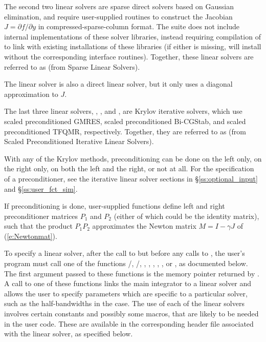 The second two linear solvers are sparse direct solvers based on
Gaussian elimination, and require user-supplied routines to construct
the Jacobian $J = \partial{f}/\partial{y}$ in compressed-sparse-column
format. The {\sundials} suite does not include internal
implementations of these solver libraries, instead requiring
compilation of {\sundials} to link with existing installations of
these libraries (if either is missing, {\sundials} will install
without the corresponding interface routines).  Together, these linear
solvers are referred to as {\cvsls} (from Sparse Linear Solvers). 

The {\cvdiag} linear solver is also a direct linear solver, but it
only uses a diagonal approximation to $J$.

The last three {\cvode} linear solvers, {\cvspgmr}, {\cvspbcg}, and {\cvsptfqmr},
are Krylov iterative solvers, which use scaled preconditioned GMRES, scaled
preconditioned Bi-CGStab, and scaled preconditioned TFQMR, respectively.
Together, they are referred to as {\cvspils} (from Scaled Preconditioned 
Iterative Linear Solvers).

With any of the Krylov methods, preconditioning can be done on the left only, 
on the right only, on both the left and the right, or not at all. 
For the specification of a preconditioner, see the iterative linear solver sections 
in \S\ref{ss:optional_input} and \S\ref{ss:user_fct_sim}.

If preconditioning is done, user-supplied functions define left and right 
preconditioner matrices $P_1$ and $P_2$ (either of which could be the identity
matrix), such that the product $P_1 P_2$ approximates the Newton matrix
$M = I - \gamma J$ of (\ref{e:Newtonmat}).

To specify a {\cvode} linear solver, after the call to 
but before any calls to , the user's program must call one
of the functions /, /, 
, , , , ,
or , as documented below. 
The first argument passed to these functions is the {\cvode}
memory pointer returned by .  A call to one of these
functions links the main {\cvode} integrator to a linear solver and
allows the user to specify parameters which are specific to a
particular solver, such as the half-bandwidths in the {\cvband} case.
The use of each of the linear solvers involves certain constants and possibly 
some macros, that are likely to be needed in the user code.  These are
available in the corresponding header file associated with the linear
solver, as specified below.

